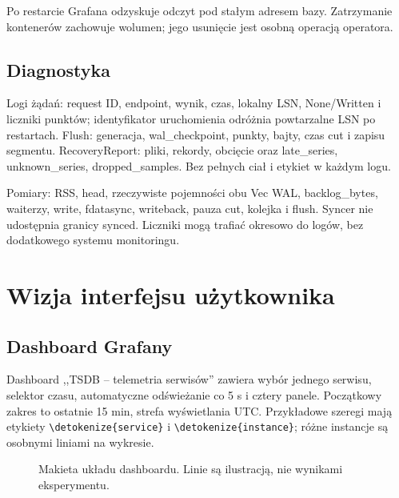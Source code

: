 \documentclass[11pt,a4paper]{article}
\newcommand{\code}[1]{\expandafter\nolinkurl\expandafter{\detokenize{#1}}}
\begin{document}
Po restarcie Grafana odzyskuje odczyt pod stałym adresem bazy. Zatrzymanie kontenerów zachowuje wolumen;
jego usunięcie jest osobną operacją operatora.

\subsection{Diagnostyka}
Logi żądań: request ID, endpoint, wynik, czas, lokalny LSN,
None/Written i liczniki punktów; identyfikator uruchomienia odróżnia
powtarzalne LSN po restartach. Flush: generacja, wal\_checkpoint,
punkty, bajty, czas cut i zapisu segmentu. RecoveryReport:
pliki, rekordy, obcięcie oraz late\_series, unknown\_series, dropped\_samples.
Bez pełnych ciał i etykiet w każdym logu.

Pomiary: RSS, head, rzeczywiste pojemności obu Vec WAL,
backlog\_bytes, waiterzy, write, fdatasync, writeback, pauza cut,
kolejka i flush. Syncer nie udostępnia granicy synced.
Liczniki mogą trafiać okresowo do logów, bez dodatkowego systemu monitoringu.

\section{Wizja interfejsu użytkownika}
\label{sec:ui}

\subsection{Dashboard Grafany}
Dashboard ,,TSDB -- telemetria serwisów'' zawiera wybór jednego serwisu,
selektor czasu, automatyczne odświeżanie co 5 s i cztery panele.
Początkowy zakres to ostatnie 15 min, strefa wyświetlania UTC.
Przykładowe szeregi mają etykiety \code{service} i \code{instance};
różne instancje są osobnymi liniami na wykresie.

\begin{figure}[htbp]
\centering
{}
\caption{Makieta układu dashboardu. Linie są ilustracją, nie wynikami eksperymentu.}
\end{figure}
\end{document}
